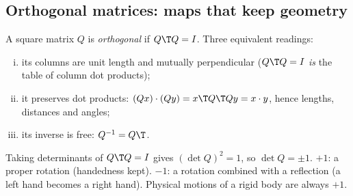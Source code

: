 \subsection{Orthogonal matrices: maps that keep geometry}\label{sec:rot:orthogonal-matrices-maps}
A square matrix $Q$ is \emph{orthogonal} if $Q\T Q=I$. Three equivalent readings:
\begin{enumerate}[(i)]
\item its columns are unit length and mutually perpendicular ($Q\T Q=I$ \emph{is} the table of column dot products);
\item it preserves dot products: $(Qx)\cdot(Qy)=x\T Q\T Qy=x\cdot y$, hence lengths, distances and angles;
\item its inverse is free: $Q^{-1}=Q\T$.
\end{enumerate}
Taking determinants of $Q\T Q=I$ gives $(\det Q)^2=1$, so $\det Q=\pm1$. $+1$: a proper rotation (handedness kept). $-1$: a rotation combined with a reflection (a left hand becomes a right hand). Physical motions of a rigid body are always $+1$.
